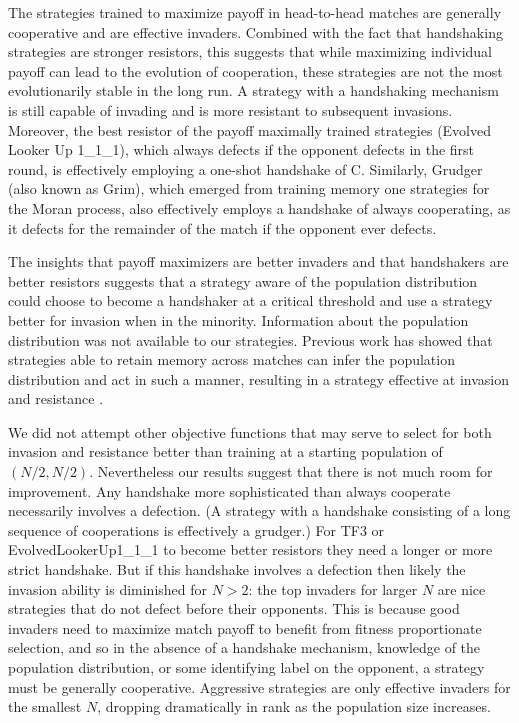 \documentclass[10pt,letterpaper]{article}
\begin{document}
The strategies trained to maximize payoff in head-to-head matches are generally
cooperative and are effective invaders.
Combined with the fact that handshaking strategies are stronger resistors,
this suggests that while maximizing individual payoff can lead to the evolution
of cooperation, these strategies are not the most evolutionarily stable
in the long run. A strategy with a handshaking mechanism is still capable of
invading and is more resistant to subsequent invasions. Moreover, the
best resistor of the payoff maximally trained strategies (Evolved Looker Up
1\_1\_1),
which always defects if the opponent defects in the first round, is effectively
employing a one-shot handshake of C. Similarly, Grudger (also known as Grim),
which emerged from training memory one strategies for the Moran process,
also effectively employs a handshake of always cooperating, as it defects
for the remainder of the match if the opponent ever defects.

The insights that payoff maximizers are better invaders and that handshakers
are better resistors suggests that a strategy
aware of the population distribution could choose to become a handshaker at
a critical threshold and use a strategy better for invasion when in the
minority. Information about the population distribution was not available
to our strategies. Previous work has showed that strategies able to retain
memory across matches can infer the population distribution and act in such
a manner, resulting in a strategy effective at invasion and resistance
\cite{Lee2015}.

We did not attempt other objective functions that may serve to select for both
invasion and resistance better than training at a starting population of
$(N/2, N/2)$. Nevertheless our results suggest that there is not much room for
improvement. Any handshake more sophisticated than always cooperate necessarily involves
a defection. (A strategy with a handshake consisting of a long sequence of cooperations is
effectively a grudger.) For TF3 or EvolvedLookerUp1\_1\_1 to become better resistors
they need a longer or more strict handshake. But if this handshake involves
a defection then likely the invasion ability is diminished for $N > 2$: the top
invaders for larger $N$ are nice strategies that do not defect before their
opponents. This is because good invaders need to maximize match payoff to benefit
from fitness proportionate selection,
and so in the absence of a handshake mechanism, knowledge of the population
distribution, or some identifying label on the opponent,
a strategy must be generally cooperative. Aggressive strategies
are only effective invaders for the smallest $N$, dropping dramatically in rank
as the population size increases.
\end{document}
